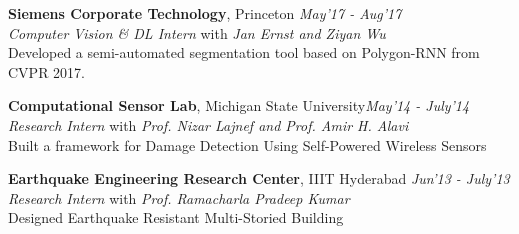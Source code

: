 \documentclass[margin,line]{res}
\newenvironment{list2}{
  \begin{list}{$\bullet$}{%
      \setlength{\itemsep}{0in}
      \setlength{\parsep}{0in} \setlength{\parskip}{0in}
      \setlength{\topsep}{0in} \setlength{\partopsep}{0in} 
      \setlength{\leftmargin}{0.2in}}}{\end{list}}
\begin{document}
\begin{resume}
{\bf Siemens Corporate Technology}, Princeton \hfill  {\em May'17 - Aug'17}\\
{\em Computer Vision \& DL Intern} with  {\em Jan Ernst and Ziyan Wu}\\
Developed a semi-automated segmentation tool based on Polygon-RNN from CVPR 2017. 

{\bf Computational Sensor Lab}, {Michigan State University}\hfill {\em May'14 - July'14} \\
{\em Research Intern} with {\em Prof. Nizar Lajnef and Prof. Amir H. Alavi}\\
Built a framework for Damage Detection Using Self-Powered Wireless Sensors

{\bf Earthquake Engineering Research Center}, {IIIT Hyderabad} \hfill {\em Jun'13 - July'13} \\
{\em Research Intern} with {\em Prof. Ramacharla Pradeep Kumar}\\
Designed Earthquake Resistant Multi-Storied Building


\end{resume}
\end{document}
